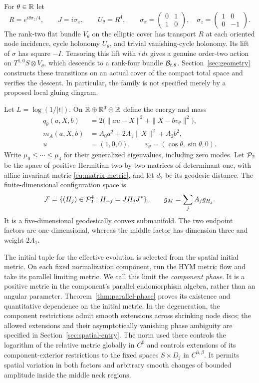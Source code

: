 For $\theta\in\mathbb R$ let
\[
 R=e^{i\theta\sigma_z/4},\qquad J=i\sigma_x,
 \qquad U_\theta=R^4,
 \qquad
 \sigma_x=\begin{pmatrix}0&1\\1&0\end{pmatrix},\quad
 \sigma_z=\begin{pmatrix}1&0\\0&-1\end{pmatrix}.
\]
The rank-two flat bundle $V_\theta$ on the elliptic cover has transport
$R$ at each oriented node incidence, cycle holonomy $U_\theta$,
and trivial vanishing-cycle holonomy. Its lift of $\sigma$ has square
$-I$. Tensoring this lift with $i\,d\iota$ gives a genuine
order-two action on $T^{1,0}S\otimes V_\theta$, which descends to
a rank-four bundle $\mathcal B_{t,\theta}$. Section~\ref{sec:geometry}
constructs these transitions on an actual cover of the compact
total space and verifies the descent. In particular, the family is
not specified merely by a proposed local gluing diagram.

Let $L=\log(1/|t|)$. On
$\mathbb R\oplus\mathbb R^3\oplus\mathbb R$ define the energy and mass
\begin{equation}\label{eq:intro-forms}
 \begin{split}
 q_\theta(a,X,b)&=2\bigl(\|au-X\|^2+\|X-bv_\theta\|^2\bigr),\\
 m_A(a,X,b)&=A_0a^2+2A_1\|X\|^2+A_2b^2,\\
 u&=(1,0,0),\qquad v_\theta=(\cos\theta,\sin\theta,0).
 \end{split}
\end{equation}
Write $\mu_0\le\cdots\le\mu_4$ for their generalized eigenvalues,
including zero modes. Let $\mathcal P_2$ be the space of positive Hermitian
two-by-two matrices of determinant one, with affine invariant metric
\eqref{eq:matrix-metric}, and let $d_2$ be its geodesic distance.
The finite-dimensional configuration space is
\[
 \mathcal F=\{(H_j)\in\mathcal P_2^4:H_{-j}=JH_jJ^*\},
 \qquad g_M=\sum_j A_jg_{H_j}.
\]
It is a five-dimensional geodesically convex submanifold. The two
endpoint factors are one-dimensional, whereas the middle factor
has dimension three and weight $2A_1$.

The initial tuple for the effective evolution is selected from the
spatial initial metric. On each fixed normalization component, run
the HYM metric flow and take its parallel limiting metric. We call
this limit the \emph{component phase}. It is a positive metric in
the component's parallel endomorphism algebra, rather than an angular
parameter. Theorem~\ref{thm:parallel-phase} proves its existence and
quantitative dependence on the initial metric. In the degeneration,
the component restrictions admit smooth extensions across shrinking
node discs; the allowed extensions and their asymptotically vanishing
phase ambiguity are specified in Section~\ref{sec:spatial-entry}.
The norm used there controls the logarithm of the relative metric
globally in $C^0$ and controls extensions of its component-exterior
restrictions to the fixed spaces $S\times D_j$ in $C^{6,\beta}$.
It permits spatial variation in both factors and arbitrary smooth
changes of bounded amplitude inside the middle neck regions.

